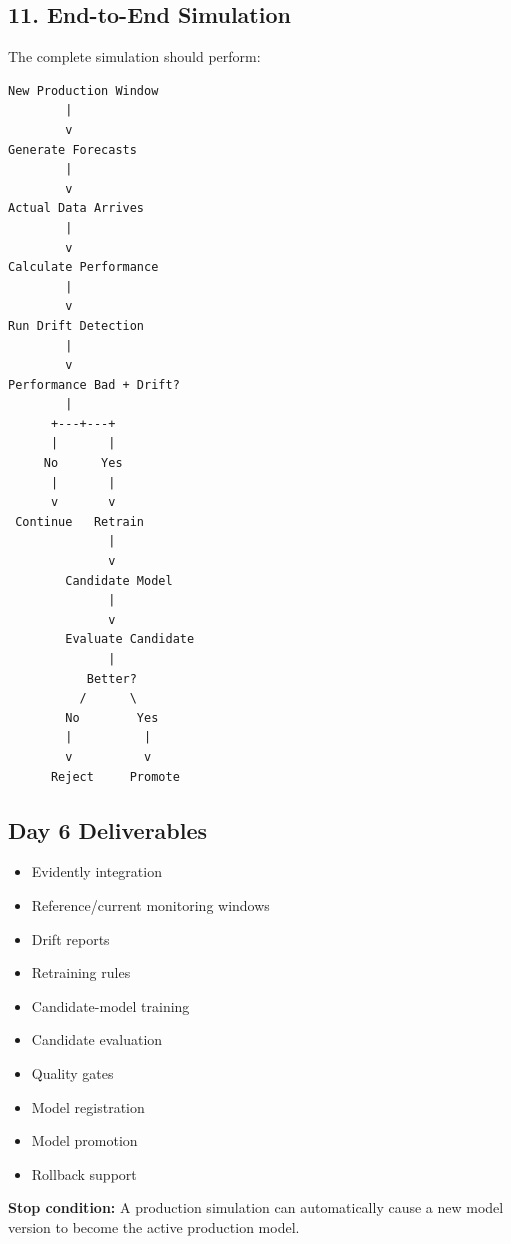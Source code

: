 \documentclass[11pt,a4paper]{article}
\newcommand{\done}{\textbf{\textcolor{codegreen}{✓}}}
\begin{document}
\subsection{11. End-to-End Simulation}

The complete simulation should perform:

\begin{verbatim}
New Production Window
        |
        v
Generate Forecasts
        |
        v
Actual Data Arrives
        |
        v
Calculate Performance
        |
        v
Run Drift Detection
        |
        v
Performance Bad + Drift?
        |
      +---+---+
      |       |
     No      Yes
      |       |
      v       v
 Continue   Retrain
              |
              v
        Candidate Model
              |
              v
        Evaluate Candidate
              |
           Better?
          /      \
        No        Yes
        |          |
        v          v
      Reject     Promote
\end{verbatim}

\subsection{Day 6 Deliverables}

\begin{itemize}
    \item[\done] Evidently integration
    \item[\done] Reference/current monitoring windows
    \item[\done] Drift reports
    \item[\done] Retraining rules
    \item[\done] Candidate-model training
    \item[\done] Candidate evaluation
    \item[\done] Quality gates
    \item[\done] Model registration
    \item[\done] Model promotion
    \item[\done] Rollback support
\end{itemize}

\textbf{Stop condition:} A production simulation can automatically cause a new model version to become the active production model.

\newpage

\end{document}
